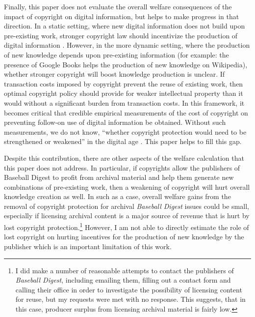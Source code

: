 \documentclass[11pt]{article}
\begin{document}
Finally, this paper does not evaluate the overall welfare consequences of the impact of copyright on digital information, but helps to make progress in that direction. In a static setting, where new digital information does not build upon pre-existing work, stronger copyright law should incentivize the production of digital information \citep{watt_copyright_2006}. However, in the more dynamic setting, where the production of new knowledge depends upon pre-existing information \citep{scotchmer_standing_1991} (for example: the presence of Google Books helps the production of new knowledge on Wikipedia), whether stronger copyright will boost knowledge production is unclear. If transaction costs imposed by copyright prevent the reuse of existing work, then optimal copyright policy should provide for weaker intellectual property than it would without a significant burden from transaction costs. In this framework, it becomes critical that credible empirical measurements of the cost of copyright on preventing follow-on use of digital information be obtained. Without such measurements, we do not know, ``whether copyright protection would need to be strengthened or weakened'' in the digital age \citep{waldfogel_copyright_2012}. This paper helps to fill this gap. 

Despite this contribution, there are other aspects of the welfare calculation that this paper does not address. In particular, if copyrights allow the publishers of Baseball Digest to profit from archival material and help them generate new combinations of pre-existing work, then a weakening of copyright will hurt overall knowledge creation as well. In such as a case, overall welfare gains from the removal of copyright protection for archival \emph{Baseball Digest} issues could be small, especially if licensing archival content is a major source of revenue that is hurt by lost copyright protection.\footnote{I did make a number of reasonable attempts to contact the publishers of \emph{Baseball Digest}, including emailing them, filling out a contact form and calling their office in order to investigate the possibility of licensing content for reuse, but my requests were met with no response. This suggests, that in this case, producer surplus from licensing archival material is fairly low.} However, I am not able to directly estimate the role of lost copyright on hurting incentives for the production of new knowledge by the publisher which is an important limitation of this work. 
\end{document}
